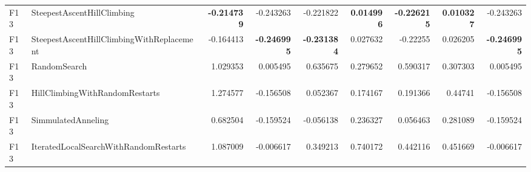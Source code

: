 \begin{tabular}{llrrrrrrr}
F13 & SteepestAscentHillClimbing & \textbf{-0.214739} & -0.243263 & -0.221822 & \textbf{0.014996} & \textbf{-0.226215} & \textbf{0.010327} & -0.243263 \\ 
F13 & SteepestAscentHillClimbingWithReplacement & -0.164413 & \textbf{-0.246995} & \textbf{-0.231384} & 0.027632 & -0.22255 & 0.026205 & \textbf{-0.246995} \\ 
F13 & RandomSearch & 1.029353 & 0.005495 & 0.635675 & 0.279652 & 0.590317 & 0.307303 & 0.005495 \\ 
F13 & HillClimbingWithRandomRestarts & 1.274577 & -0.156508 & 0.052367 & 0.174167 & 0.191366 & 0.44741 & -0.156508 \\ 
F13 & SimmulatedAnneling & 0.682504 & -0.159524 & -0.056138 & 0.236327 & 0.056463 & 0.281089 & -0.159524 \\ 
F13 & IteratedLocalSearchWithRandomRestarts & 1.087009 & -0.006617 & 0.349213 & 0.740172 & 0.442116 & 0.451669 & -0.006617 \\ 
\bottomrule
\end{tabular}
